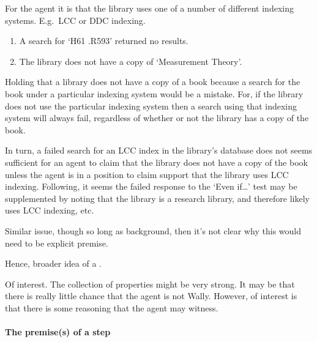 \begin{note}
  \begin{illustration}
    For the agent it is \epVAd{} that the library uses one of a number of different indexing systems.
    E.g.\ LCC or DDC indexing.
    \begin{enumerate}
    \item A search for `H61 .R593' returned no results.
    \item The library does not have a copy of `Measurement Theory'.
    \end{enumerate}
  \end{illustration}

  Holding that a library does not have a copy of a book because a search for the book under a particular indexing system would be a mistake.
  For, if the library does not use the particular indexing system then a search using that indexing system will always fail, regardless of whether or not the library has a copy of the book.

  In turn, a failed search for an LCC index in the library's database does not seems sufficient for an agent to claim that the library does not have a copy of the book unless the agent is in a position to claim support that the library uses LCC indexing.
  Following, it seems the failed response to the `Even if\dots' test may be supplemented by noting that the library is a research library, and therefore likely uses LCC indexing, etc.\
\end{note}

\begin{note}
  Similar issue, though so long as background, then it's not clear why this would need to be explicit premise.

  Hence, broader idea of a \requ{}.
\end{note}

\begin{note}
  Of interest.
  The collection of properties might be very strong.
  It may be that there is really little chance that the agent is not Wally.
  However, of interest is that there is some reasoning that the agent may witness.
\end{note}

\paragraph*{The premise(s) of a step}

